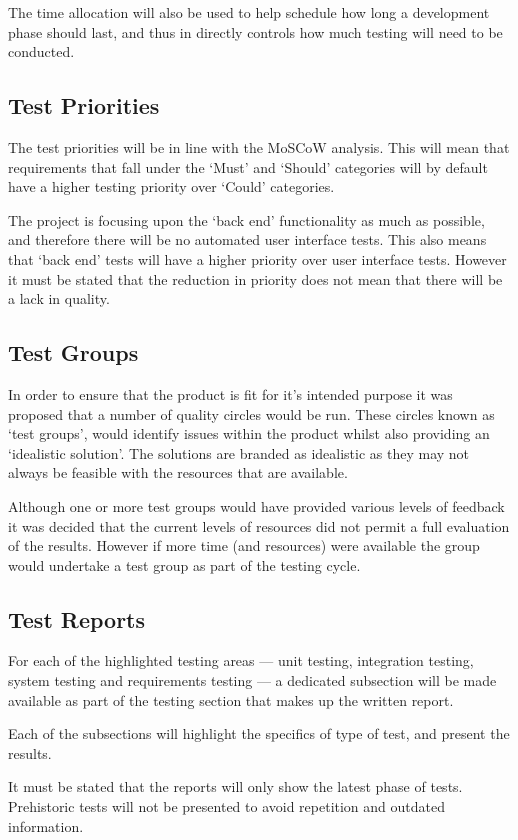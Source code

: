 The time allocation will also be used to help schedule how long a development 
phase should last, and thus in directly controls how much testing will need to
be conducted.


\subsection{Test Priorities}
\label{sub:test_priorities}

The test priorities will be in line with the MoSCoW analysis. This will mean 
that requirements that fall under the `Must' and `Should' categories will by 
default have a higher testing priority over `Could' categories.

The project is focusing upon the `back end' functionality as much as possible, 
and therefore there will be no automated user interface tests. This also means
that `back end' tests will have a higher priority over user interface tests. 
However it must be stated that the reduction in priority does not mean that 
there will be a lack in quality.


\subsection{Test Groups}
\label{sub:test_groups}

In order to ensure that the product is fit for it's intended purpose it was 
proposed that a number of quality circles would be run. These circles known as 
`test groups', would identify issues within the product whilst also providing an
`idealistic solution'. The solutions are branded as idealistic as they may not 
always be feasible with the resources that are available.

Although one or more test groups would have provided various levels of feedback
it was decided that the current levels of resources did not permit a full 
evaluation of the results. However if more time (and resources) were available 
the group would undertake a test group as part of the testing cycle.


\subsection{Test Reports}
\label{sub:test_reports}

For each of the highlighted testing areas --- unit testing, integration testing,
system testing and requirements testing --- a dedicated subsection will be 
made available as part of the testing section that makes up the written report.

Each of the subsections will highlight the specifics of type of test, and 
present the results.

It must be stated that the reports will only show the latest phase of tests. 
Prehistoric tests will not be presented to avoid repetition and outdated
information.
